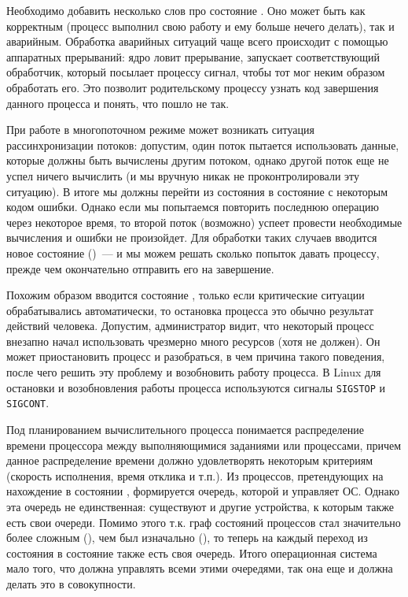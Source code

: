 Необходимо добавить несколько слов про состояние . Оно может
быть как корректным (процесс выполнил свою работу и ему больше нечего делать),
так и аварийным. Обработка аварийных ситуаций чаще всего происходит с помощью
аппаратных прерываний: ядро ловит прерывание, запускает соответствующий
обработчик, который посылает процессу сигнал, чтобы тот мог неким образом
обработать его. Это позволит родительскому процессу узнать код завершения
данного процесса и понять, что пошло не так.

При работе в многопоточном режиме может возникать ситуация рассинхронизации
потоков: допустим, один поток пытается использовать данные, которые должны быть
вычислены другим потоком, однако другой поток еще не успел ничего вычислить (и
мы вручную никак не проконтролировали эту ситуацию). В итоге мы должны перейти
из состояния  в состояние  с некоторым
кодом ошибки. Однако если мы попытаемся повторить последнюю операцию через
некоторое время, то второй поток (возможно) успеет провести необходимые
вычисления и ошибки не произойдет. Для обработки таких случаев вводится новое
состояние  ()~--- и мы можем
решать сколько попыток давать процессу, прежде чем окончательно отправить его на
завершение.


Похожим образом вводится состояние , только если критические
ситуации обрабатывались автоматически, то остановка процесса это обычно
результат действий человека. Допустим, администратор видит, что некоторый
процесс внезапно начал использовать чрезмерно много ресурсов (хотя не должен).
Он может приостановить процесс и разобраться, в чем причина такого поведения,
после чего решить эту проблему и возобновить работу процесса. В Linux для
остановки и возобновления работы процесса используются сигналы \texttt{SIGSTOP}
и \texttt{SIGCONT}.


Под планированием вычислительного процесса понимается распределение времени
процессора между выполняющимися заданиями или процессами, причем данное
распределение времени должно удовлетворять некоторым критериям (скорость
исполнения, время отклика и т.п.). Из процессов, претендующих на нахождение в
состоянии , формируется очередь, которой и управляет ОС.
Однако эта очередь не единственная: существуют и другие устройства, к которым
также есть свои очереди. Помимо этого т.к. граф состояний процессов стал
значительно более сложным (), чем был изначально
(), то теперь на каждый переход из состояния в состояние также
есть своя очередь. Итого операционная система мало того, что должна управлять
всеми этими очередями, так она еще и должна делать это в совокупности.

